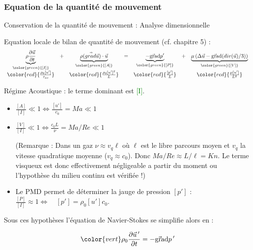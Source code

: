 \subsubsection{Equation de la quantité de mouvement}
\begin{frame}{Conservation de la quantité de mouvement : Analyse dimensionnelle}

\small

Equation locale de bilan de quantité de mouvement (cf. chapitre 5) :
\begin{equation}
\begin{array}{ccccccc}
\underbrace{\rho \dpdt{\myvec{u}}}_{\color{green}{[I]}} 
&+& 
\underbrace{\rho (\mytensor{grad} \myvec{u} ) \cdot \myvec{u}}_{\color{green}{[A]}} 
 &=&
\underbrace{ - \gradient p' }_{\color{green}{[P]}} 
 &+& 
 \underbrace{ \mu \left( \Delta \myvec{u} - \gradient (div(\myvec{u})/3)  \right)}_{\color{green}{[V]}} 
  \\
  \color{red}{\frac{\rho_0 [u']}{\tau_{ac}}}
  &&
   \color{red}{\frac{\rho_0 [u']^2}{L}}
&&
   \color{red}{\frac{[p']}{L}}
   &&
    \color{red}{\frac{\mu [u'] }{L^2}}
   \end{array}
\end{equation}

\pause

Régime Acoustique : le terme dominant est \textcolor{green}{[I]}.


\begin{itemize}
\item $\frac{[A]}{[I]}  \ll 1 \Longleftrightarrow \frac{[u']}{c_0} = Ma \ll 1$

\item $\frac{[V]}{[I]}  \ll 1 \Longleftrightarrow \frac{c_0 L}{\nu } = Ma / Re \ll 1$


{
\tiny
\color{gray}
(Remarque : Dans un gaz $\nu \approx v_q \ell$ où $\ell$ est le libre parcours moyen et $v_q$ la vitesse quadratique moyenne ($v_q \approx c_0$).
Donc $Ma / Re \approx L/\ell = Kn$. Le terme  visqueux est donc effectivement négligeable a partir du moment ou l'hypothèse du milieu continu est vérifiée !)
}
 


\item Le PMD permet de déterminer la jauge de pression $[p']$  : 
$\frac{[P]}{[I]}  \approx 1 \Longleftrightarrow \quad [p'] = \rho_0 [u'] c_0 $.
\end{itemize}


Sous ces hypothèses l'équation de Navier-Stokes se simplifie alors en :

$$
\color{vert}
\rho_0 \dpdt{\myvec{u}\myprime} = - \gradient p \myprime
$$

\end{frame}



